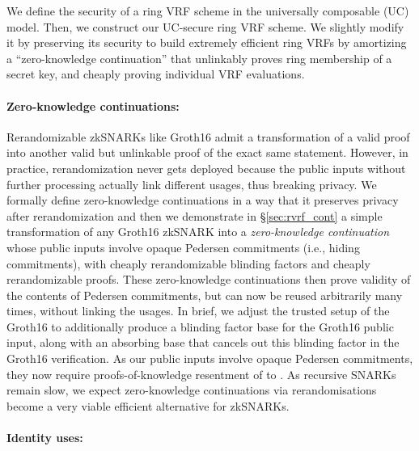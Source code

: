 We define the security of a ring VRF scheme in the universally composable (UC) \cite{canetti1,canetti2} model. Then, we construct our UC-secure ring VRF scheme. We slightly modify it by preserving its security to build extremely efficient 
ring VRFs by amortizing a ``zero-knowledge continuation'' that unlinkably
proves ring membership of a secret key, and  cheaply proving
individual VRF evaluations.


\paragraph{Zero-knowledge continuations:}

Rerandomizable zkSNARKs like Groth16 \cite{Groth16} admit a
transformation of a valid proof into another valid but unlinkable
proof of the exact same statement.  However, in practice, rerandomization
never gets deployed because the public inputs without further processing actually 
link different usages, thus breaking privacy.
We formally define zero-knowledge continuations in a way that it preserves privacy after rerandomization and then  we demonstrate in \S\ref{sec:rvrf_cont} a simple transformation of
any Groth16 zkSNARK into a {\it zero-knowledge continuation} whose
public inputs involve opaque Pedersen commitments (i.e., hiding commitments), with cheaply
rerandomizable blinding factors and cheaply rerandomizable proofs.
These zero-knowledge continuations then prove validity of the contents
of Pedersen commitments, but can now be reused arbitrarily many times,
without linking the usages.
In brief, we adjust the trusted setup of the Groth16 to additionally
produce a blinding factor base for the Groth16 public input, 
along with an absorbing base that cancels out this blinding factor in the
Groth16 verification.
As our public inputs involve opaque Pedersen commitments,
they now require proofs-of-knowledge resentment of to \cite{LegoSNARK}. 
As recursive SNARKs remain slow,
we expect zero-knowledge continuations via rerandomisations become a very viable efficient alternative for zkSNARKs.

\paragraph{Identity uses:}

